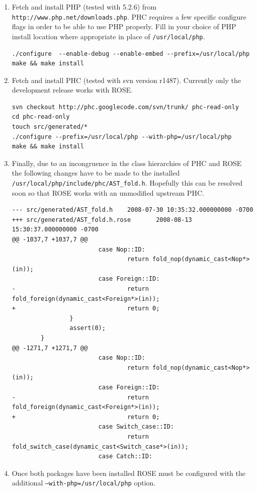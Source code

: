 \begin{enumerate}
\item
Fetch and install PHP (tested with 5.2.6) from
\texttt{http://www.php.net/downloads.php}.  PHC requires a few
specific configure flags in order to be able to use PHP properly.
Fill in your choice of PHP install location where appropriate in place
of \texttt{/usr/local/php}.
\begin{verbatim}
./configure  --enable-debug --enable-embed --prefix=/usr/local/php
make && make install
\end{verbatim}

\item
Fetch and install PHC (tested with svn version r1487).  Currently only
the development release works with ROSE.
\begin{verbatim}
svn checkout http://phc.googlecode.com/svn/trunk/ phc-read-only
cd phc-read-only
touch src/generated/*                                                       
./configure --prefix=/usr/local/php --with-php=/usr/local/php
make && make install
\end{verbatim}

\item
Finally, due to an incongruence in the class hierarchies of PHC and
ROSE the following changes have to be made to the installed
\texttt{/usr/local/php/include/phc/AST\_fold.h}.  Hopefully this can be
resolved soon so that ROSE works with an unmodified upstream PHC.

\begin{verbatim}
--- src/generated/AST_fold.h    2008-07-30 10:35:32.000000000 -0700
+++ src/generated/AST_fold.h.rose       2008-08-13 15:30:37.000000000 -0700
@@ -1037,7 +1037,7 @@
                        case Nop::ID:
                                return fold_nop(dynamic_cast<Nop*>(in));
                        case Foreign::ID:
-                               return fold_foreign(dynamic_cast<Foreign*>(in));
+                               return 0;
                }
                assert(0);
        }
@@ -1271,7 +1271,7 @@
                        case Nop::ID:
                                return fold_nop(dynamic_cast<Nop*>(in));
                        case Foreign::ID:
-                               return fold_foreign(dynamic_cast<Foreign*>(in));
+                               return 0;
                        case Switch_case::ID:
                                return fold_switch_case(dynamic_cast<Switch_case*>(in));
                        case Catch::ID:
\end{verbatim}

\item
Once both packages have been installed ROSE must be configured with
the additional \texttt{--with-php=/usr/local/php} option.
\end{enumerate}

